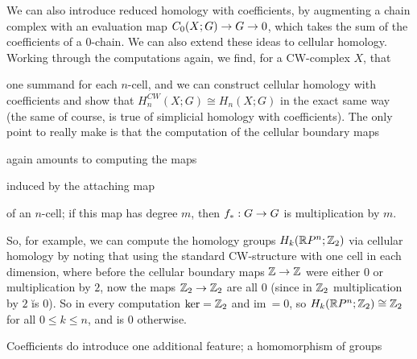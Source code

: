 \ssk

We can also introduce
reduced homology with coefficients, by augmenting a chain complex with an evaluation map 
$C_0(X;G)\rightarrow G\rightarrow 0$, which takes the sum of the coefficients of a $0$-chain. 
We can also extend these ideas to cellular homology. Working through
the computations again, we find, for a CW-complex $X$, that 

\ssk


\ssk

one summand for each $n$-cell, and we can construct cellular 
homology with coefficients and show that $H_n^{CW}(X;G)\cong H_n(X;G)$ in the exact same way 
(the same of course, is true of simplicial homology with coefficients). The only point to really
make is that the computation of the cellular boundary maps 

\ssk


\ssk

again amounts to computing
the maps 

\ssk


\ssk

induced by the attaching map 

\ssk


\ssk

of an $n$-cell; 
if this map has degree $m$, then $f_*:G\rightarrow G$ is multiplication by $m$. 

\vfill
\eject

So, for
example, we can compute the homology groups 
$H_k({\Bbb R} P^n;{\Bbb Z}_2)$ via cellular homology by noting that using the standard CW-structure
with one cell in each dimension, where before the cellular boundary maps ${\Bbb Z}\rightarrow{\Bbb Z}$ were either
$0$ or multiplication by $2$, now the maps ${\Bbb Z}_2\rightarrow {\Bbb Z}_2$ are all $0$ (since in ${\Bbb Z}_2$ 
multiplication by $2$ \u{is} $0$). So in every computation $\ker = {\Bbb Z}_2$ and $\text{im}\ = 0$,
so $H_k({\Bbb R} P^n;{\Bbb Z}_2)\cong {\Bbb Z}_2$ for all $0\leq k\leq n$, and is $0$ otherwise.

\msk

Coefficients do introduce one additional feature; a homomorphism of groups


